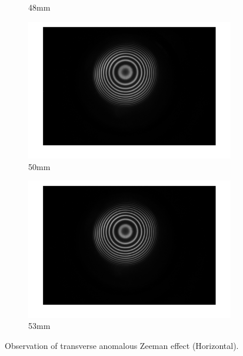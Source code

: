 \documentclass[a4paper,12pt]{article}
\begin{document}
\begin{figure}[H]
\begin{subfigure}[b]{0.3\textwidth}
        \caption{48mm}
      \end{subfigure}
    
      \vspace{0.5cm}
    
      \begin{subfigure}[b]{0.3\textwidth}
        \includegraphics[width=1.2\textwidth]{tra_ano_stripe_hor_50.png}
        \caption{50mm}
      \end{subfigure}
      \hfill
      \begin{subfigure}[b]{0.3\textwidth}
        \includegraphics[width=1.2\textwidth]{tra_ano_stripe_hor_53.png}
        \caption{53mm}
      \end{subfigure}
    
      \caption{Observation of transverse anomalous Zeeman effect (Horizontal).}
      \label{fig:tra_ano_hor_fiveimages}
    \end{figure}
    
\end{document}
